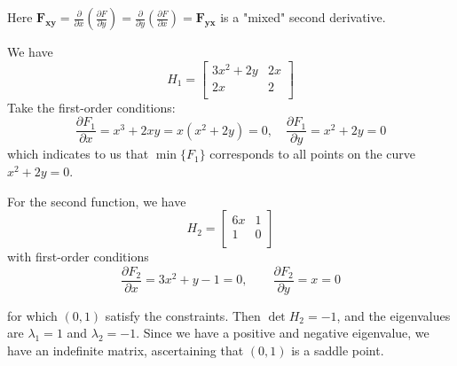 \documentclass[a4paper]{article}
\begin{document}
\noindent Here \(\displaystyle{\bm{F_{xy}} = \frac{\partial }{\partial x} \!\left( \frac{\partial F}{\partial y}  \right) = \frac{\partial }{\partial y} \!\left( \frac{\partial F}{\partial x}  \right) = \bm{F_{yx}}}\) is a "mixed" second derivative.

\vspace{12pt}


We have 
\[
	H_{1} = 
	\begin{bmatrix}
		3x^{2} + 2y & 2x \\
		2x & 2 \\
	\end{bmatrix}
\]
Take the first-order conditions:
\[
	\frac{\partial F_{1}}{\partial x} = x^{3} + 2xy = x \!\left( x^{2} + 2y \right) = 0, \quad \frac{\partial F_{1}}{\partial y} = x^{2} + 2y = 0
\]
which indicates to us that \(\min\{F_{1}\}\) corresponds to all points on the curve \(x^{2} + 2y = 0\).

For the second function, we have
\[
	H_{2} =
	\begin{bmatrix}
		6x & 1 \\
		1 & 0 \\
	\end{bmatrix}
\]
with first-order conditions
\[
	\frac{\partial F_{2}}{\partial x} = 3x^{2} + y - 1 = 0, \qquad \frac{\partial F_{2}}{\partial y} = x = 0
\]

for which \(\!\left( 0, 1 \right) \) satisfy the constraints. Then \(\det H_{2} = -1\), and the eigenvalues are \(\lambda_{1} = 1\) and \(\lambda_{2} = -1\). Since we have a positive and negative eigenvalue, we have an indefinite matrix, ascertaining that \(\!\left( 0,1 \right) \) is a saddle point.
\end{document}
